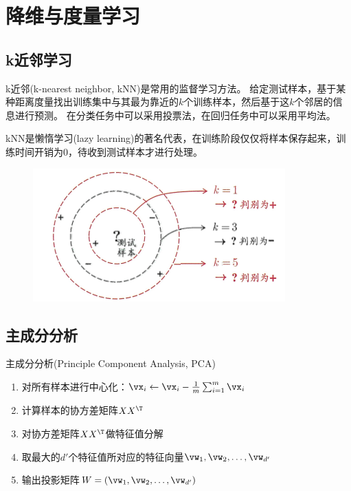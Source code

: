 
\section{降维与度量学习}
\subsection{k近邻学习}
k近邻(k-nearest neighbor, kNN)是常用的监督学习方法。
给定测试样本，基于某种距离度量找出训练集中与其最为靠近的$k$个训练样本，然后基于这$k$个邻居的信息进行预测。
在分类任务中可以采用投票法，在回归任务中可以采用平均法。

kNN是懒惰学习(lazy learning)的著名代表，在训练阶段仅仅将样本保存起来，训练时间开销为0，待收到测试样本才进行处理。
\begin{figure}[H]
\centering
\includegraphics[width=0.4\linewidth]{fig/kNN.png}
\end{figure}

\subsection{主成分分析}
主成分分析(Principle Component Analysis, PCA)

\begin{enumerate}
	\item 对所有样本进行中心化：$\vx_i\gets \vx_i-\frac{1}{m}\sum_{i=1}^m\vx_i$
	\item 计算样本的协方差矩阵$XX^\T$
	\item 对协方差矩阵$XX^\T$做特征值分解
	\item 取最大的$d'$个特征值所对应的特征向量$\vw_1,\vw_2,\ldots,\vw_{d'}$
	\item 输出投影矩阵$W=(\vw_1,\vw_2,\ldots,\vw_{d'})$
\end{enumerate}
